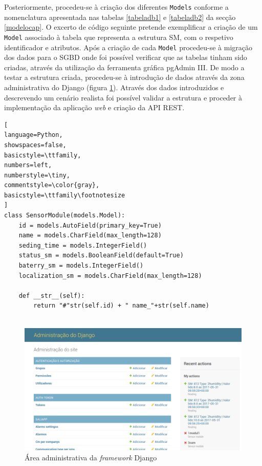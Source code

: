 Posteriormente, procedeu-se à criação dos diferentes \texttt{Models} conforme a nomenclatura apresentada nas tabelas \ref{tabeladb1} e \ref{tabeladb2} da secção \ref{modelocap}. O excerto de código seguinte pretende exemplificar a criação de um \texttt{Model} associado à tabela que representa a estrutura \acl{SM}, com o respetivo identificador e atributos.  Após a criação de cada \texttt{Model} procedeu-se à migração dos dados para o \ac{SGBD} onde foi possível verificar que as tabelas tinham sido criadas, através da utilização da ferramenta gráfica pgAdmin III. De modo a testar a estrutura criada, procedeu-se à introdução de dados através da zona administrativa do Django (figura \ref{admingdjango}). Através dos dados introduzidos e descrevendo um cenário realista foi possível validar a estrutura e proceder à implementação da aplicação \textit{web} e criação da \ac{API} \ac{REST}. 




\begin{lstlisting}[
language=Python,
showspaces=false,
basicstyle=\ttfamily,
numbers=left,
numberstyle=\tiny,
commentstyle=\color{gray},
basicstyle=\ttfamily\footnotesize
]
class SensorModule(models.Model):
	id = models.AutoField(primary_key=True)
	name = models.CharField(max_length=128)
	seding_time = models.IntegerField()
	status_sm = models.BooleanField(default=True)
	baterry_sm = models.IntegerField()
	localization_sm = models.CharField(max_length=128)
		
	def __str__(self):
		return "#"str(self.id) + " name_"+str(self.name)


\end{lstlisting}


\begin{figure}[!htb]
	\centering
	\includegraphics[scale=0.4]{prints-web/admindjango.png}
	\caption{Área administrativa da \textit{framework} Django }
	\label{admingdjango}
\end{figure}








